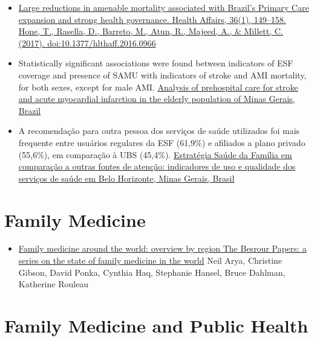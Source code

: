 \documentclass[]{book}
\providecommand{\tightlist}{%
  \setlength{\itemsep}{0pt}\setlength{\parskip}{0pt}}
\begin{document}
\begin{itemize}
\item
  \href{https://www.healthaffairs.org/doi/full/10.1377/hlthaff.2016.0966?url_ver=Z39.88-2003\&rfr_id=ori:rid:crossref.org\&rfr_dat=cr_pub\%3dpubmed}{Large reductions in amenable mortality associated with Brazil's Primary Care expansion and strong health governance. Health Affairs, 36(1), 149--158. Hone, T., Rasella, D., Barreto, M., Atun, R., Majeed, A., \& Millett, C. (2017). doi:10.1377/hlthaff.2016.0966}
\item
  Statistically significant associations were found between indicators of ESF coverage and presence of SAMU with indicators of stroke and AMI mortality, for both sexes, except for male AMI. \href{http://www.scielo.br/pdf/ramb/v56n4/en_19.pdf}{Analysis of prehospital care for stroke and acute myocardial infarction in the elderly population of Minas Gerais, Brazil}
\item
  A recomendação para outra pessoa dos serviços de saúde utilizados foi mais frequente entre usuários regulares da ESF (61,9\%) e afiliados a plano privado (55,6\%), em comparação à UBS (45,4\%). \href{http://www.scielo.br/scielo.php?script=sci_arttext\&pid=S0102-311X2013000700011\&lng=en\&nrm=iso\&tlng=en}{Estratégia Saúde da Família em comparação a outras fontes de atenção: indicadores de uso e qualidade dos serviços de saúde em Belo Horizonte, Minas Gerais, Brasil}
\end{itemize}

\hypertarget{family-medicine}{%
\section*{Family Medicine}\label{family-medicine}}

\begin{itemize}
\tightlist
\item
  \href{https://www.ncbi.nlm.nih.gov/pmc/articles/PMC5471080/pdf/0630436.pdf}{Family medicine around the world: overview by region The Besrour Papers: a series on the state of family medicine in the world} Neil Arya, Christine Gibson, David Ponka, Cynthia Haq, Stephanie Hansel, Bruce Dahlman, Katherine Rouleau
\end{itemize}

\hypertarget{family-medicine-and-public-health}{%
\section*{Family Medicine and Public Health}\label{family-medicine-and-public-health}}
\end{document}

